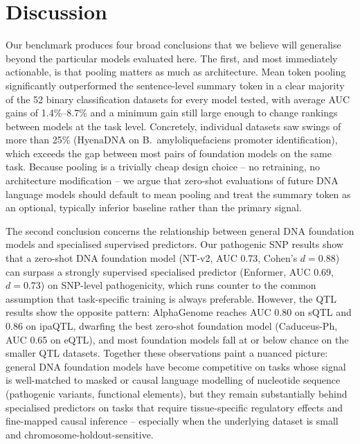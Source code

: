 \documentclass[11pt,a4paper]{article}
\begin{document}
\section{Discussion}

Our benchmark produces four broad conclusions that we believe will generalise beyond the particular models evaluated here. The first, and most immediately actionable, is that pooling matters as much as architecture. Mean token pooling significantly outperformed the sentence-level summary token in a clear majority of the 52 binary classification datasets for every model tested, with average AUC gains of 1.4\%--8.7\% and a minimum gain still large enough to change rankings between models at the task level. Concretely, individual datasets saw swings of more than 25\% (HyenaDNA on B.~amyloliquefaciens promoter identification), which exceeds the gap between most pairs of foundation models on the same task. Because pooling is a trivially cheap design choice -- no retraining, no architecture modification -- we argue that zero-shot evaluations of future DNA language models should default to mean pooling and treat the summary token as an optional, typically inferior baseline rather than the primary signal.

The second conclusion concerns the relationship between general DNA foundation models and specialised supervised predictors. Our pathogenic SNP results show that a zero-shot DNA foundation model (NT-v2, AUC 0.73, Cohen's $d=0.88$) can surpass a strongly supervised specialised predictor (Enformer, AUC 0.69, $d=0.73$) on SNP-level pathogenicity, which runs counter to the common assumption that task-specific training is always preferable. However, the QTL results show the opposite pattern: AlphaGenome reaches AUC 0.80 on sQTL and 0.86 on ipaQTL, dwarfing the best zero-shot foundation model (Caduceus-Ph, AUC 0.65 on eQTL), and most foundation models fall at or below chance on the smaller QTL datasets. Together these observations paint a nuanced picture: general DNA foundation models have become competitive on tasks whose signal is well-matched to masked or causal language modelling of nucleotide sequence (pathogenic variants, functional elements), but they remain substantially behind specialised predictors on tasks that require tissue-specific regulatory effects and fine-mapped causal inference -- especially when the underlying dataset is small and chromosome-holdout-sensitive.
\end{document}

